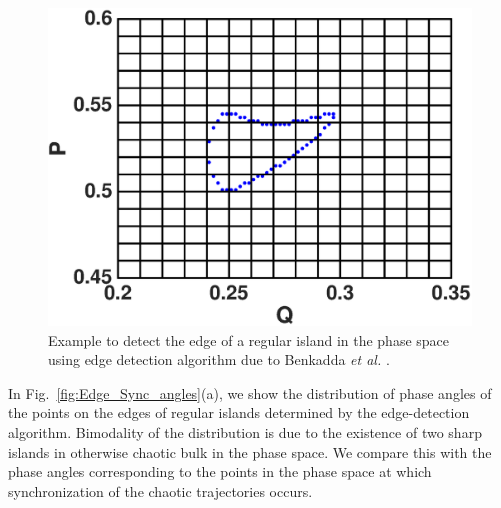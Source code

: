 \documentclass[reprint,amsmath,amssymb,aps,pre]{revtex4-1}
\begin{document}
\begin{figure}[b]
    \includegraphics[scale=0.45]{edge_reg_island.eps}
    \caption{\label{fig:edge_reg_island} \footnotesize Example to detect the 
    edge of a regular island in the phase space using edge detection 
    algorithm  due to Benkadda {\it et al.} \cite{Benkadda1997}. }
\end{figure}

In Fig.~\ref{fig:Edge_Sync_angles}(a), we show the distribution of phase angles of the points on the edges of regular islands determined by the edge-detection algorithm.  Bimodality of the distribution is due to the existence of two sharp islands in otherwise chaotic bulk in the phase space.  We compare this with the phase angles corresponding to the points in the phase space at which synchronization of the chaotic trajectories occurs.
\end{document}
